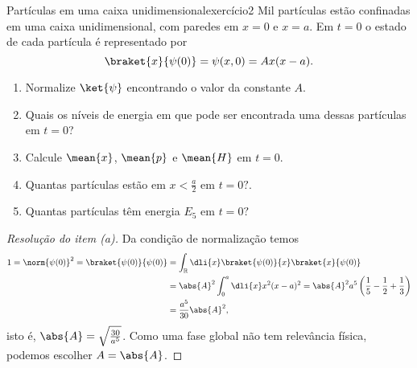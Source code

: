\begin{exercício}{Partículas em uma caixa unidimensional}{exercício2}
    Mil partículas estão confinadas em uma caixa unidimensional, com paredes em \(x = 0\) e \(x = a\). Em \(t = 0\) o estado de cada partícula é representado por
    \begin{equation*}
        \braket{x}{\psi(0)} = \psi(x,0) = A x(x-a).
    \end{equation*}
    \begin{enumerate}[label=(\alph*)]
        \item Normalize \(\ket{\psi}\) encontrando o valor da constante \(A\).
        \item Quais os níveis de energia em que pode ser encontrada uma dessas partículas em \(t = 0\)?
        \item Calcule \(\mean{x}\), \(\mean{p}\) e \(\mean{H}\) em \(t = 0\).
        \item Quantas partículas estão em \(x < \frac{a}2\) em \(t = 0?\).
        \item Quantas partículas têm energia \(E_5\) em \(t = 0?\)
    \end{enumerate}
\end{exercício}
\begin{proof}[Resolução do item (a)]
    Da condição de normalização temos
    \begin{align*}
        1 = \norm{\psi(0)}^2 = \braket{\psi(0)}{\psi(0)} &= \int_{\mathbb{R}} \dli{x} \braket{\psi(0)}{x}\braket{x}{\psi(0)}\\
                                                         &= \abs{A}^2\int_0^a \dli{x}x^2(x-a)^2 = \abs{A}^2 a^5\left(\frac15- \frac12 + \frac13\right)\\
                                                         &= \frac{a^5}{30}\abs{A}^2,
    \end{align*}
    isto é, \(\abs{A} = \sqrt{\frac{30}{a^5}}\). Como uma fase global não tem relevância física, podemos escolher \(A = \abs{A}\).
\end{proof}

